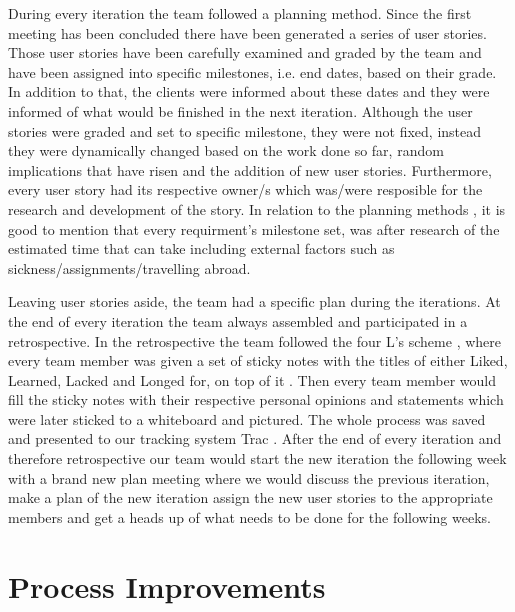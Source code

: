 \documentclass{l3proj}
\begin{document}
During every iteration the team followed a planning method. Since the first meeting has been concluded there have been generated a series of
user stories. Those user stories have been carefully examined and graded by the team and have been assigned into specific milestones, i.e.
end dates, based on their grade. In addition to that, the clients were informed about these dates and they were informed of what would be finished in the next iteration. Although the user stories were graded and set to specific milestone, they were not fixed, instead they were dynamically changed based on the work done so far, random implications that have risen and the addition of new user stories. Furthermore, every user story had its respective owner/s which was/were resposible for the research and development of the story. In relation to the planning methods , it is good to mention that every requirment's milestone set, was after research of the estimated time that can take including external factors such as sickness/assignments/travelling abroad.

Leaving user stories aside, the team had a specific plan during the iterations. At the end of every iteration the team always assembled
and participated in a retrospective. In the retrospective the team followed  the four L's scheme , where every team member was given a set
of sticky notes with the titles of either Liked, Learned, Lacked and Longed for, on top of it . Then every team member would fill the sticky notes with their respective personal opinions and statements which were later sticked to a whiteboard and pictured. The whole process was
saved and presented to our tracking system Trac . After the end of every iteration and therefore retrospective our team would start the new iteration the following week with a brand new plan meeting where we would discuss the previous iteration, make a plan of the new iteration
assign the new user stories to the appropriate members and get a heads up of what needs to be done for the following weeks.

\section{Process Improvements}
\label{sec:process-improvements}

\end{document}
